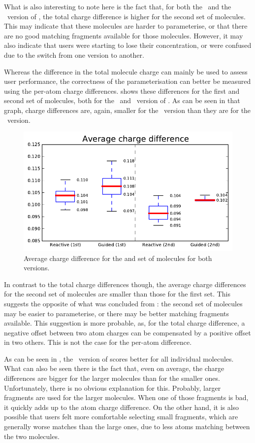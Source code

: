 What is also interesting to note here is the fact that, for both the \IDa\ and the \IDb\ version of \oframp, the total charge difference is higher for the second set of molecules. This may indicate that these molecules are harder to parameterise, or that there are no good matching fragments available for those molecules. However, it may also indicate that users were starting to lose their concentration, or were confused due to the switch from one version to another.

Whereas the difference in the total molecule charge can mainly be used to assess user performance, the correctness of the parameterisation can better be measured using the per-atom charge differences.  shows these differences for the first and second set of molecules, both for the \IDa\ and \IDb\ version of \oframp. As can be seen in that graph, charge differences are, again, smaller for the \IDa\ version than they are for the \IDb\ version.

\begin{figure}[h!]
\center
\includegraphics[width=.6\textwidth]{img/graphs/1a_01.pdf}
\caption{Average charge difference for the  and  set of molecules for both versions.}
\end{figure}

In contrast to the total charge differences though, the average charge differences for the second set of molecules are smaller than those for the first set. This suggests the opposite of what was concluded from : the second set of molecules may be easier to parameterise, or there may be better matching fragments available. This suggestion is more probable, as, for the total charge difference, a negative offset between two atom charges can be compensated by a positive offset in two others. This is not the case for the per-atom difference.

As can be seen in , the \IDa\ version of \oframp{} scores better for all individual molecules. What can also be seen there is the fact that, even on average, the charge differences are bigger for the larger molecules than for the smaller ones. Unfortunately, there is no obvious explanation for this. Probably, larger fragments are used for the larger molecules. When one of those fragments is bad, it quickly adds up to the atom charge difference. On the other hand, it is also possible that users felt more comfortable selecting small fragments, which are generally worse matches than the large ones, due to less atoms matching between the two molecules.

